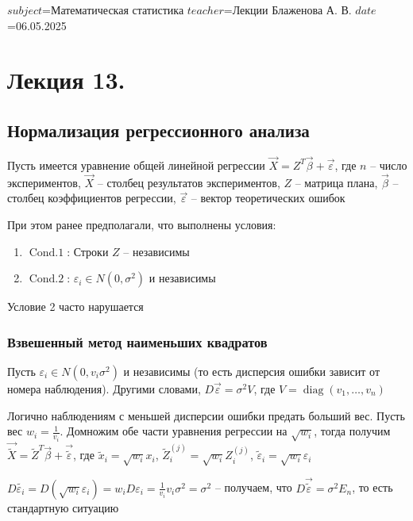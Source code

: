 $subject$=Математическая статистика
$teacher$=Лекции Блаженова А. В.
$date$=06.05.2025

\section{Лекция 13.}

\subsection{Нормализация регрессионного анализа}

Пусть имеется уравнение общей линейной регрессии $\vec X = Z^T \vec \beta + \vec \varepsilon$, где $n$ -- число экспериментов, $\vec X$ -- столбец результатов экспериментов, $Z$ -- матрица плана, $\vec \beta$ -- столбец коэффициентов регрессии, $\vec \varepsilon$ -- вектор теоретических ошибок

При этом ранее предполагали, что выполнены условия:

\begin{enumerate}
    \item $\operatorname{Cond. 1}$: Строки $Z$ -- независимы
    \item $\operatorname{Cond. 2}$: $\varepsilon_i \in N(0, \sigma^2)$ и независимы
\end{enumerate}

Условие 2 часто нарушается

\hypertarget{weighted_mls}{}

\subsubsection{Взвешенный метод наименьших квадратов}

Пусть $\varepsilon_i \in N(0, v_i \sigma^2)$ и независимы (то есть дисперсия ошибки зависит от номера наблюдения). Другими словами, $D \vec \varepsilon = \sigma^2 V$, где $V = \operatorname{diag} (v_1, \dots, v_n)$

Логично наблюдениям с меньшей дисперсии ошибки предать больший вес. Пусть вес $w_i = \frac{1}{v_i}$. Домножим обе части уравнения регрессии на $\sqrt{w_i}$, тогда получим $\vec \tilde{X} = \tilde Z^T \vec \beta + \vec \tilde{\varepsilon}$, где $\tilde x_i=  \sqrt{w_i} x_i$, $\tilde Z^{(j)}_i = \sqrt{w_i} Z^{(j)}_i$, $\tilde \varepsilon_i = \sqrt{w_i} \varepsilon_i$

$D \tilde{\varepsilon_i} = D(\sqrt{w_i} \varepsilon_i) = w_i D \varepsilon_i = \frac{1}{v_i} v_i \sigma^2 = \sigma^2$ -- получаем, что $D \vec \tilde{\varepsilon} = \sigma^2 E_n$, то есть стандартную ситуацию

